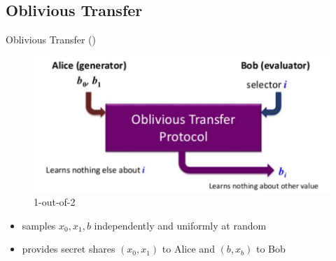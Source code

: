 \subsection{Oblivious Transfer}
\begin{frame}{Oblivious Transfer (\OT)}
	\begin{figure}
		\begin{center}
			\includegraphics[scale = 0.5]{OT-1}
		\end{center}
	\caption{1-out-of-2 \OT}
	\end{figure}
	
	\begin{definition}
	\begin{itemize}
		\item samples $ x_0, x_1, b  $ independently and uniformly at random 
		\item provides secret shares $ (x_0, x_1) $ to Alice and $ (b, x_b) $ to Bob
	\end{itemize}
	\end{definition}
\end{frame}


